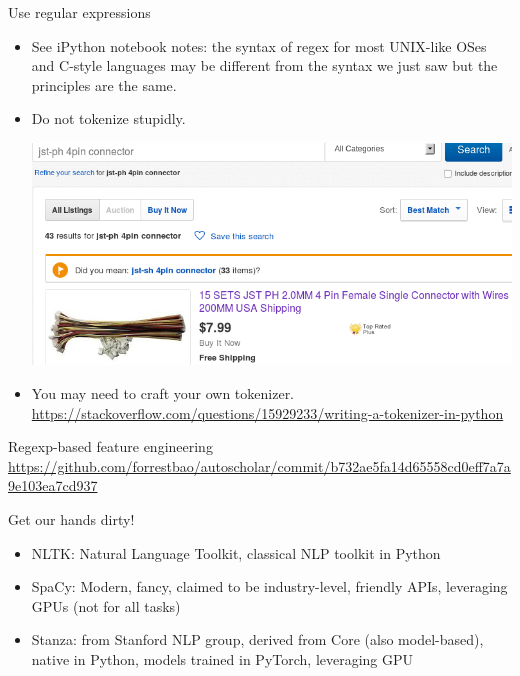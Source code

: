 \documentclass[11pt]{beamer}
\begin{document}
\begin{frame}{Use regular expressions}
\begin{itemize}
 \item  See iPython notebook notes: the syntax of regex for most UNIX-like OSes and C-style languages may be different from the syntax we just saw but the principles are the same. 
 \item Do not tokenize stupidly.
 
 \includegraphics[width=.9\textwidth]{ebay_connector.png}
 \item You may need to craft your own tokenizer. \url{https://stackoverflow.com/questions/15929233/writing-a-tokenizer-in-python}
\end{itemize}
\end{frame}

\begin{frame}{Regexp-based feature engineering}
 \url{https://github.com/forrestbao/autoscholar/commit/b732ae5fa14d65558cd0eff7a7a9e103ea7cd937}
\end{frame}

\begin{frame}{Get our hands dirty!}
  \begin{itemize}
    \item NLTK: Natural Language Toolkit, classical NLP toolkit in Python
    \item SpaCy: Modern, fancy, claimed to be industry-level, friendly APIs, leveraging GPUs (not for all tasks)
    \item Stanza: from Stanford NLP group, derived from Core (also model-based), native in Python, models trained in PyTorch, leveraging GPU
  \end{itemize}
\end{frame}
\end{document}
